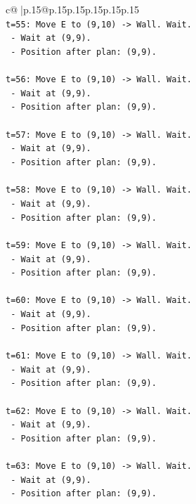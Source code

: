 \documentclass{article}
\begin{document}
{\begin{supertabular}{c@{$\;$}|p{.15\linewidth}@{}p{.15\linewidth}p{.15\linewidth}p{.15\linewidth}p{.15\linewidth}p{.15\linewidth}}
{{{\\ 
\texttt{t=55: Move E to (9,10) {-}> Wall. Wait.} \\
\texttt{   {-} Wait at (9,9).} \\
\texttt{   {-} Position after plan: (9,9).} \\
\\ 
\texttt{t=56: Move E to (9,10) {-}> Wall. Wait.} \\
\texttt{   {-} Wait at (9,9).} \\
\texttt{   {-} Position after plan: (9,9).} \\
\\ 
\texttt{t=57: Move E to (9,10) {-}> Wall. Wait.} \\
\texttt{   {-} Wait at (9,9).} \\
\texttt{   {-} Position after plan: (9,9).} \\
\\ 
\texttt{t=58: Move E to (9,10) {-}> Wall. Wait.} \\
\texttt{   {-} Wait at (9,9).} \\
\texttt{   {-} Position after plan: (9,9).} \\
\\ 
\texttt{t=59: Move E to (9,10) {-}> Wall. Wait.} \\
\texttt{   {-} Wait at (9,9).} \\
\texttt{   {-} Position after plan: (9,9).} \\
\\ 
\texttt{t=60: Move E to (9,10) {-}> Wall. Wait.} \\
\texttt{   {-} Wait at (9,9).} \\
\texttt{   {-} Position after plan: (9,9).} \\
\\ 
\texttt{t=61: Move E to (9,10) {-}> Wall. Wait.} \\
\texttt{   {-} Wait at (9,9).} \\
\texttt{   {-} Position after plan: (9,9).} \\
\\ 
\texttt{t=62: Move E to (9,10) {-}> Wall. Wait.} \\
\texttt{   {-} Wait at (9,9).} \\
\texttt{   {-} Position after plan: (9,9).} \\
\\ 
\texttt{t=63: Move E to (9,10) {-}> Wall. Wait.} \\
\texttt{   {-} Wait at (9,9).} \\
\texttt{   {-} Position after plan: (9,9).} \\
}}}
\end{supertabular}}
\end{document}

